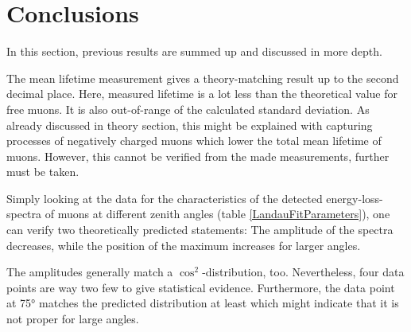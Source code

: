 \section{Conclusions}

In this section, previous results are summed up and discussed in more depth.

The mean lifetime measurement gives a theory-matching result up to the second decimal place. Here, measured lifetime is a lot less than the theoretical value for free muons. It is also out-of-range of the calculated standard deviation. As already discussed in theory section, this might be explained with capturing processes of negatively charged muons which lower the total mean lifetime of muons. However, this cannot be verified from the made measurements, further must be taken.

Simply looking at the data for the characteristics of the detected energy-loss-spectra of muons at different zenith angles (table \ref{LandauFitParameters}), one can verify two theoretically predicted statements: The amplitude of the spectra decreases, while the position of the maximum increases for larger angles. 

The amplitudes generally match a $\cos^2$-distribution, too. Nevertheless, four data points are way two few to give statistical evidence. Furthermore, the data point at 75° matches the predicted distribution at least which might indicate that it is not proper for large angles.
	 
